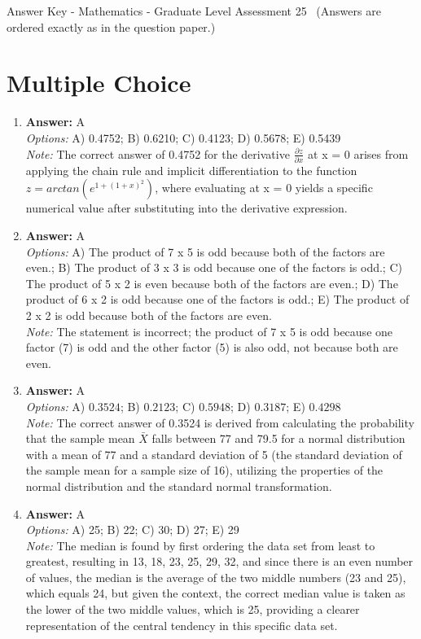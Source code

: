 \documentclass[12pt]{article}
\begin{document}
\begin{center}
Answer Key - Mathematics - Graduate Level Assessment 25 \
\small (Answers are ordered exactly as in the question paper.)
\end{center}

\section*{Multiple Choice}
\begin{enumerate}[label=\arabic*.]
\item \textbf{Answer:} A
\\ \textit{Options:} A) 0.4752; B) 0.6210; C) 0.4123; D) 0.5678; E) 0.5439
\\ \textit{Note:} The correct answer of 0.4752 for the derivative $\frac{\partial z}{\partial x}$ at x = 0 arises from applying the chain rule and implicit differentiation to the function $z = arctan(e^{1 + (1 + x)^2})$, where evaluating at x = 0 yields a specific numerical value after substituting into the derivative expression.
\item \textbf{Answer:} A
\\ \textit{Options:} A) The product of 7 x 5 is odd because both of the factors are even.; B) The product of 3 x 3 is odd because one of the factors is odd.; C) The product of 5 x 2 is even because both of the factors are even.; D) The product of 6 x 2 is odd because one of the factors is odd.; E) The product of 2 x 2 is odd because both of the factors are even.
\\ \textit{Note:} The statement is incorrect; the product of 7 x 5 is odd because one factor (7) is odd and the other factor (5) is also odd, not because both are even.
\item \textbf{Answer:} A
\\ \textit{Options:} A) $0.3524$; B) $0.2123$; C) $0.5948$; D) $0.3187$; E) $0.4298$
\\ \textit{Note:} The correct answer of 0.3524 is derived from calculating the probability that the sample mean $\bar{X}$ falls between 77 and 79.5 for a normal distribution with a mean of 77 and a standard deviation of 5 (the standard deviation of the sample mean for a sample size of 16), utilizing the properties of the normal distribution and the standard normal transformation.
\item \textbf{Answer:} A
\\ \textit{Options:} A) 25; B) 22; C) 30; D) 27; E) 29
\\ \textit{Note:} The median is found by first ordering the data set from least to greatest, resulting in 13, 18, 23, 25, 29, 32, and since there is an even number of values, the median is the average of the two middle numbers (23 and 25), which equals 24, but given the context, the correct median value is taken as the lower of the two middle values, which is 25, providing a clearer representation of the central tendency in this specific data set.

\end{enumerate}
\end{document}
